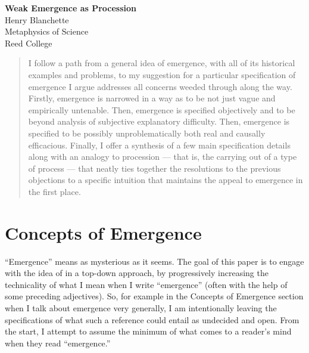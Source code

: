 \documentclass{article}
\begin{document}

\begin{center}
	\huge{\bf Weak Emergence as Procession} %
    \\[0.75cm] 
	\large{Henry Blanchette} %
    \\[0.5cm]
	\large{Metaphysics of Science \\ Reed College} %
    \\[1.0cm]
\end{center}

\begin{abstract}
    I follow a path from a general idea of emergence, with all of its historical examples and problems, to my suggestion for a particular specification of emergence I argue addresses all concerns weeded through along the way. Firstly, emergence is narrowed in a way as to be not just vague and empirically untenable. Then, emergence is specified objectively and to be beyond analysis of subjective explanatory difficulty. Then, emergence is specified to be possibly unproblematically both real and causally efficacious. Finally, I offer a synthesis of a few main specification details along with an analogy to procession --- that is, the carrying out of a type of process --- that neatly ties together the resolutions to the previous objections to a specific intuition that maintains the appeal to emergence in the first place.
\end{abstract}

\section{Concepts of Emergence}

``Emergence'' means as mysterious as it seems. The goal of this paper is to engage with the idea of in a top-down approach, by progressively increasing the technicality of what I mean when I write ``emergence'' (often with the help of some preceding adjectives). So, for example in the Concepts of Emergence section when I talk about emergence very generally, I am intentionally leaving the specifications of what such a reference could entail as undecided and open. From the start, I attempt to assume the minimum of what comes to a reader's mind when they read ``emergence.''
\end{document}

